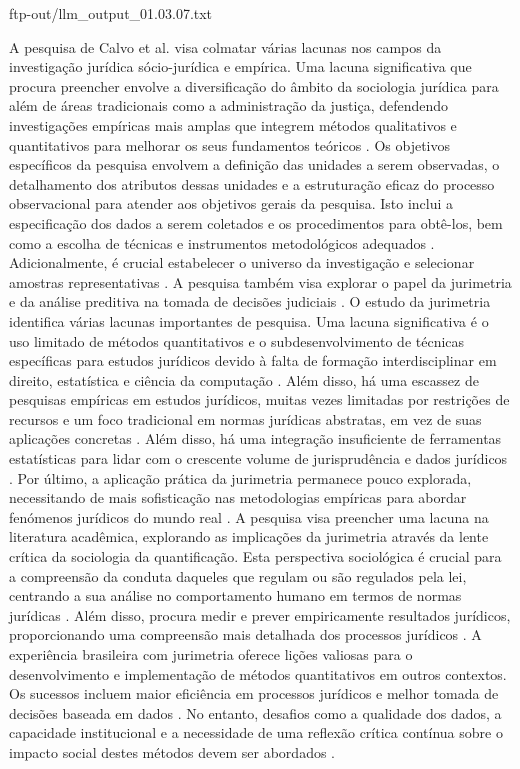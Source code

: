 \begin{agradecimentos}
    ftp-out/llm_output_01.03.07.txt 
    
    A pesquisa de Calvo et al. visa colmatar várias lacunas nos campos da investigação jurídica sócio-jurídica e empírica. Uma lacuna significativa que procura preencher envolve a diversificação do âmbito da sociologia jurídica para além de áreas tradicionais como a administração da justiça, defendendo investigações empíricas mais amplas que integrem métodos qualitativos e quantitativos para melhorar os seus fundamentos teóricos \cite{calvo2024}. Os objetivos específicos da pesquisa envolvem a definição das unidades a serem observadas, o detalhamento dos atributos dessas unidades e a estruturação eficaz do processo observacional para atender aos objetivos gerais da pesquisa. Isto inclui a especificação dos dados a serem coletados e os procedimentos para obtê-los, bem como a escolha de técnicas e instrumentos metodológicos adequados \cite{calvo2024}. Adicionalmente, é crucial estabelecer o universo da investigação e selecionar amostras representativas \cite{calvo2024}. A pesquisa também visa explorar o papel da jurimetria e da análise preditiva na tomada de decisões judiciais \cite{calvo2024}. O estudo da jurimetria identifica várias lacunas importantes de pesquisa. Uma lacuna significativa é o uso limitado de métodos quantitativos e o subdesenvolvimento de técnicas específicas para estudos jurídicos devido à falta de formação interdisciplinar em direito, estatística e ciência da computação \cite{nunes2018,nunes2018}. Além disso, há uma escassez de pesquisas empíricas em estudos jurídicos, muitas vezes limitadas por restrições de recursos e um foco tradicional em normas jurídicas abstratas, em vez de suas aplicações concretas \cite{nunes2018}. Além disso, há uma integração insuficiente de ferramentas estatísticas para lidar com o crescente volume de jurisprudência e dados jurídicos \cite{de2010}. Por último, a aplicação prática da jurimetria permanece pouco explorada, necessitando de mais sofisticação nas metodologias empíricas para abordar fenómenos jurídicos do mundo real \cite{massuanganhe2016}. A pesquisa visa preencher uma lacuna na literatura acadêmica, explorando as implicações da jurimetria através da lente crítica da sociologia da quantificação. Esta perspectiva sociológica é crucial para a compreensão da conduta daqueles que regulam ou são regulados pela lei, centrando a sua análise no comportamento humano em termos de normas jurídicas \cite{101111lsi12334}. Além disso, procura medir e prever empiricamente resultados jurídicos, proporcionando uma compreensão mais detalhada dos processos jurídicos \cite{101111lsi12334}. A experiência brasileira com jurimetria oferece lições valiosas para o desenvolvimento e implementação de métodos quantitativos em outros contextos. Os sucessos incluem maior eficiência em processos jurídicos e melhor tomada de decisões baseada em dados \cite{10.1007/s11186-021-09453-1}. No entanto, desafios como a qualidade dos dados, a capacidade institucional e a necessidade de uma reflexão crítica contínua sobre o impacto social destes métodos devem ser abordados \cite{10.1007/s11186-021-09453-1}. 
    

\end{agradecimentos}

